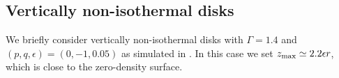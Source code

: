 \subsection{Vertically non-isothermal disks}
We briefly consider vertically non-isothermal disks with 
$\Gamma=1.4$ and $(p,q,\epsilon)=(0,-1,0.05)$ as simulated in
\cite{nelson13}. In this case we set $z_\mathrm{max}\simeq2.2\epsilon r$, which
is close to the zero-density surface.     




